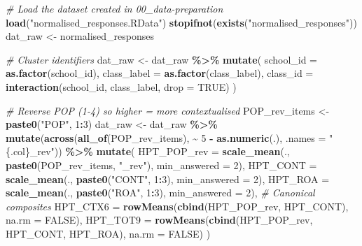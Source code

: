\documentclass[
  10pt,
]{article}
\newenvironment{Shaded}{\begin{snugshade}}{\end{snugshade}}
\newcommand{\AttributeTok}[1]{\textcolor[rgb]{0.13,0.29,0.53}{#1}}
\newcommand{\CommentTok}[1]{\textcolor[rgb]{0.56,0.35,0.01}{\textit{#1}}}
\newcommand{\ConstantTok}[1]{\textcolor[rgb]{0.56,0.35,0.01}{#1}}
\newcommand{\DecValTok}[1]{\textcolor[rgb]{0.00,0.00,0.81}{#1}}
\newcommand{\FunctionTok}[1]{\textcolor[rgb]{0.13,0.29,0.53}{\textbf{#1}}}
\newcommand{\NormalTok}[1]{#1}
\newcommand{\OtherTok}[1]{\textcolor[rgb]{0.56,0.35,0.01}{#1}}
\newcommand{\SpecialCharTok}[1]{\textcolor[rgb]{0.81,0.36,0.00}{\textbf{#1}}}
\newcommand{\StringTok}[1]{\textcolor[rgb]{0.31,0.60,0.02}{#1}}
\begin{document}
\begin{Shaded}
\begin{Highlighting}[]
\CommentTok{\# Load the dataset created in 00\_data{-}preparation}
\FunctionTok{load}\NormalTok{(}\StringTok{"normalised\_responses.RData"}\NormalTok{)}
\FunctionTok{stopifnot}\NormalTok{(}\FunctionTok{exists}\NormalTok{(}\StringTok{"normalised\_responses"}\NormalTok{))}
\NormalTok{dat\_raw }\OtherTok{\textless{}{-}}\NormalTok{ normalised\_responses}

\CommentTok{\# Cluster identifiers}
\NormalTok{dat\_raw }\OtherTok{\textless{}{-}}\NormalTok{ dat\_raw }\SpecialCharTok{\%\textgreater{}\%}
  \FunctionTok{mutate}\NormalTok{(}
    \AttributeTok{school\_id   =} \FunctionTok{as.factor}\NormalTok{(school\_id),}
    \AttributeTok{class\_label =} \FunctionTok{as.factor}\NormalTok{(class\_label),}
    \AttributeTok{class\_id    =} \FunctionTok{interaction}\NormalTok{(school\_id, class\_label, }\AttributeTok{drop =} \ConstantTok{TRUE}\NormalTok{)}
\NormalTok{  )}

\CommentTok{\# Reverse POP (1{-}4) so higher = more contextualised}
\NormalTok{POP\_rev\_items }\OtherTok{\textless{}{-}} \FunctionTok{paste0}\NormalTok{(}\StringTok{"POP"}\NormalTok{, }\DecValTok{1}\SpecialCharTok{:}\DecValTok{3}\NormalTok{)}
\NormalTok{dat\_raw }\OtherTok{\textless{}{-}}\NormalTok{ dat\_raw }\SpecialCharTok{\%\textgreater{}\%}
  \FunctionTok{mutate}\NormalTok{(}\FunctionTok{across}\NormalTok{(}\FunctionTok{all\_of}\NormalTok{(POP\_rev\_items), }\SpecialCharTok{\textasciitilde{}} \DecValTok{5} \SpecialCharTok{{-}} \FunctionTok{as.numeric}\NormalTok{(.), }\AttributeTok{.names =} \StringTok{"\{.col\}\_rev"}\NormalTok{)) }\SpecialCharTok{\%\textgreater{}\%}
  \FunctionTok{mutate}\NormalTok{(}
    \AttributeTok{HPT\_POP\_rev =} \FunctionTok{scale\_mean}\NormalTok{(., }\FunctionTok{paste0}\NormalTok{(POP\_rev\_items, }\StringTok{"\_rev"}\NormalTok{), }\AttributeTok{min\_answered =} \DecValTok{2}\NormalTok{),}
    \AttributeTok{HPT\_CONT    =} \FunctionTok{scale\_mean}\NormalTok{(., }\FunctionTok{paste0}\NormalTok{(}\StringTok{"CONT"}\NormalTok{, }\DecValTok{1}\SpecialCharTok{:}\DecValTok{3}\NormalTok{), }\AttributeTok{min\_answered =} \DecValTok{2}\NormalTok{),}
    \AttributeTok{HPT\_ROA     =} \FunctionTok{scale\_mean}\NormalTok{(., }\FunctionTok{paste0}\NormalTok{(}\StringTok{"ROA"}\NormalTok{, }\DecValTok{1}\SpecialCharTok{:}\DecValTok{3}\NormalTok{), }\AttributeTok{min\_answered =} \DecValTok{2}\NormalTok{),}
    \CommentTok{\# Canonical composites}
    \AttributeTok{HPT\_CTX6    =} \FunctionTok{rowMeans}\NormalTok{(}\FunctionTok{cbind}\NormalTok{(HPT\_POP\_rev, HPT\_CONT), }\AttributeTok{na.rm =} \ConstantTok{FALSE}\NormalTok{),}
    \AttributeTok{HPT\_TOT9    =} \FunctionTok{rowMeans}\NormalTok{(}\FunctionTok{cbind}\NormalTok{(HPT\_POP\_rev, HPT\_CONT, HPT\_ROA),}
                           \AttributeTok{na.rm =} \ConstantTok{FALSE}\NormalTok{)}
\NormalTok{  )}
\end{Highlighting}
\end{Shaded}
\end{document}
